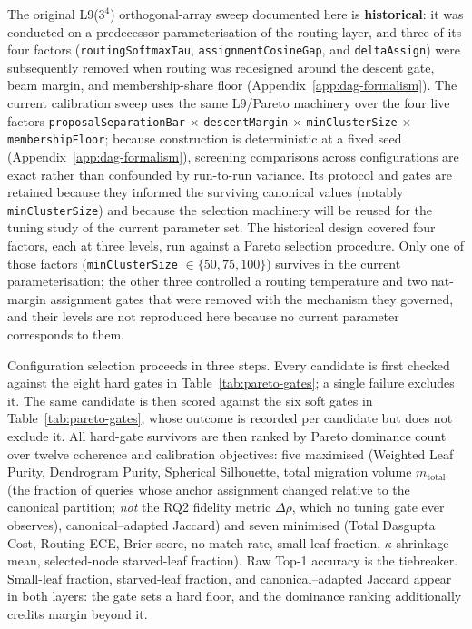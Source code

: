 The original L9($3^4$) orthogonal-array sweep documented here is
\textbf{historical}: it was conducted on a predecessor
parameterisation of the routing layer, and three of its four
factors (\texttt{routingSoftmaxTau}, \texttt{assignmentCosineGap},
and \texttt{deltaAssign}) were subsequently removed when routing was
redesigned around the descent gate, beam margin, and
membership-share floor (Appendix~\ref{app:dag-formalism}).
The current calibration sweep uses the same L9/Pareto machinery over
the four live factors
\texttt{proposalSeparationBar} $\times$ \texttt{descentMargin} $\times$
\texttt{minClusterSize} $\times$ \texttt{membershipFloor};
because construction is deterministic at a fixed seed
(Appendix~\ref{app:dag-formalism}), screening comparisons across
configurations are exact rather than confounded by run-to-run
variance.
Its protocol and gates are retained because they informed the
surviving canonical values (notably \texttt{minClusterSize}) and
because the selection machinery will be reused for the tuning study
of the current parameter set.
The historical design covered four factors, each at three levels, run
against a Pareto selection procedure. Only one of those factors
(\texttt{minClusterSize} $\in \{50, 75, 100\}$) survives in the current
parameterisation; the other three controlled a routing temperature and
two nat-margin assignment gates that were removed with the mechanism
they governed, and their levels are not reproduced here because no
current parameter corresponds to them.

Configuration selection proceeds in three steps. Every candidate is
first checked against the eight hard gates in
Table~\ref{tab:pareto-gates}; a single failure excludes it. The same
candidate is then scored against the six soft gates in
Table~\ref{tab:pareto-gates}, whose outcome is recorded per candidate
but does not exclude it. All hard-gate survivors are then ranked by
Pareto dominance count over twelve coherence and calibration
objectives: five maximised (Weighted Leaf Purity, Dendrogram Purity,
Spherical Silhouette, total migration volume $m_{\text{total}}$ (the
fraction of queries whose anchor assignment changed relative to the
canonical partition; \emph{not} the RQ2 fidelity metric $\Delta\rho$,
which no tuning gate ever observes),
canonical--adapted Jaccard) and seven minimised (Total Dasgupta Cost,
Routing ECE, Brier score, no-match rate, small-leaf fraction,
$\kappa$-shrinkage mean, selected-node starved-leaf
fraction). Raw Top-1 accuracy is the tiebreaker. Small-leaf
fraction, starved-leaf fraction, and canonical--adapted Jaccard
appear in both layers: the gate sets a hard floor, and the dominance
ranking additionally credits margin beyond it.


